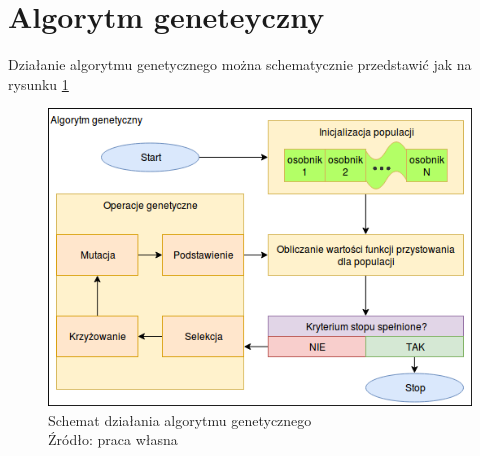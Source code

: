\cite{cs231n}

\section{Algorytm geneteyczny}\label{sec:ag}

Działanie algorytmu genetycznego można schematycznie przedstawić jak na rysunku \ref{fig:gen_schemat}

\begin{figure}[h!tb]
	 \centering
	 \includegraphics[width = 1.0\linewidth]{img/genetyczny_schemat}
	 \caption{Schemat działania algorytmu genetycznego \\
              Źródło: praca własna}
	 \label{fig:gen_schemat}
\end{figure}
